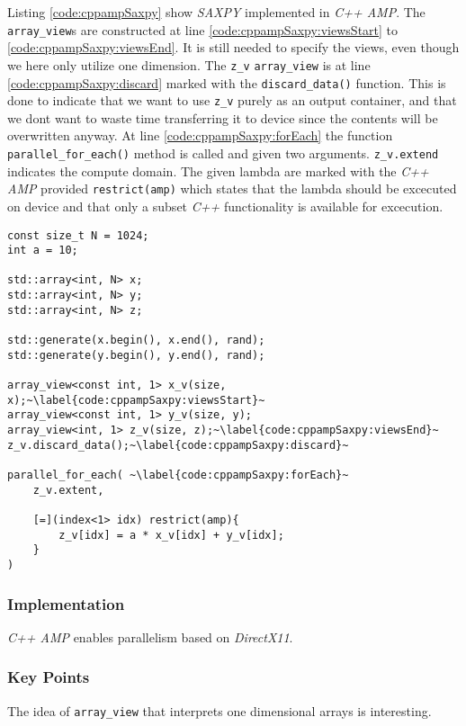 Listing \ref{code:cppampSaxpy} show \textit{SAXPY} implemented in \textit{C++ AMP}. The \texttt{array\_view}s are constructed at line \ref{code:cppampSaxpy:viewsStart} to \ref{code:cppampSaxpy:viewsEnd}. It is still needed to specify the views, even though we here only utilize one dimension. The \texttt{z\_v} \texttt{array\_view} is at line \ref{code:cppampSaxpy:discard} marked with the \texttt{discard\_data()} function. This is done to indicate that we want to use \texttt{z\_v} purely as an output container, and that we dont want to waste time transferring it to device since the contents will be overwritten anyway.
At line \ref{code:cppampSaxpy:forEach} the function \texttt{parallel\_for\_each()} method is called and given two arguments. \texttt{z\_v.extend} indicates the compute domain. The given lambda are marked with the \textit{C++ AMP} provided \texttt{restrict(amp)} which states that the lambda should be excecuted on device and that only a subset \textit{C++} functionality is available for excecution.
\begin{lstlisting}[caption={\textit{C++ AMP} \textit{SAXPY} example.}, label={code:cppampSaxpy}]
const size_t N = 1024;
int a = 10;

std::array<int, N> x;
std::array<int, N> y;
std::array<int, N> z;

std::generate(x.begin(), x.end(), rand);
std::generate(y.begin(), y.end(), rand);

array_view<const int, 1> x_v(size, x);~\label{code:cppampSaxpy:viewsStart}~
array_view<const int, 1> y_v(size, y);
array_view<int, 1> z_v(size, z);~\label{code:cppampSaxpy:viewsEnd}~
z_v.discard_data();~\label{code:cppampSaxpy:discard}~

parallel_for_each( ~\label{code:cppampSaxpy:forEach}~
    z_v.extent,

    [=](index<1> idx) restrict(amp){
        z_v[idx] = a * x_v[idx] + y_v[idx];
    }
)
\end{lstlisting}

\subsubsection{Implementation}
\textit{C++ AMP} enables parallelism based on \textit{DirectX11}.

\subsubsection{Key Points}


The idea of \texttt{array\_view} that interprets one dimensional arrays is interesting. 



